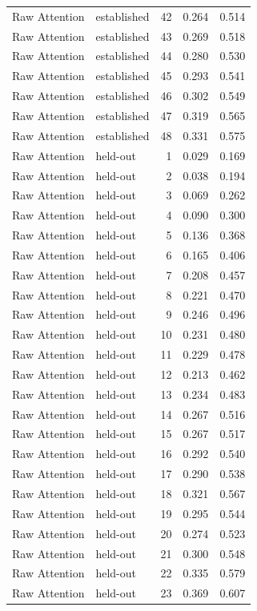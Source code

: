 \begin{tabular}{llrrr}
Raw Attention & established & 42 & 0.264 & 0.514 \\
Raw Attention & established & 43 & 0.269 & 0.518 \\
Raw Attention & established & 44 & 0.280 & 0.530 \\
Raw Attention & established & 45 & 0.293 & 0.541 \\
Raw Attention & established & 46 & 0.302 & 0.549 \\
Raw Attention & established & 47 & 0.319 & 0.565 \\
Raw Attention & established & 48 & 0.331 & 0.575 \\
Raw Attention & held-out & 1 & 0.029 & 0.169 \\
Raw Attention & held-out & 2 & 0.038 & 0.194 \\
Raw Attention & held-out & 3 & 0.069 & 0.262 \\
Raw Attention & held-out & 4 & 0.090 & 0.300 \\
Raw Attention & held-out & 5 & 0.136 & 0.368 \\
Raw Attention & held-out & 6 & 0.165 & 0.406 \\
Raw Attention & held-out & 7 & 0.208 & 0.457 \\
Raw Attention & held-out & 8 & 0.221 & 0.470 \\
Raw Attention & held-out & 9 & 0.246 & 0.496 \\
Raw Attention & held-out & 10 & 0.231 & 0.480 \\
Raw Attention & held-out & 11 & 0.229 & 0.478 \\
Raw Attention & held-out & 12 & 0.213 & 0.462 \\
Raw Attention & held-out & 13 & 0.234 & 0.483 \\
Raw Attention & held-out & 14 & 0.267 & 0.516 \\
Raw Attention & held-out & 15 & 0.267 & 0.517 \\
Raw Attention & held-out & 16 & 0.292 & 0.540 \\
Raw Attention & held-out & 17 & 0.290 & 0.538 \\
Raw Attention & held-out & 18 & 0.321 & 0.567 \\
Raw Attention & held-out & 19 & 0.295 & 0.544 \\
Raw Attention & held-out & 20 & 0.274 & 0.523 \\
Raw Attention & held-out & 21 & 0.300 & 0.548 \\
Raw Attention & held-out & 22 & 0.335 & 0.579 \\
Raw Attention & held-out & 23 & 0.369 & 0.607 \\

\end{tabular}
